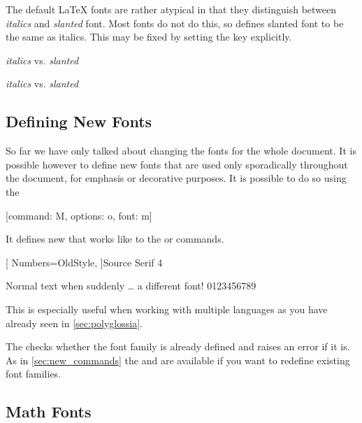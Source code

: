 The default \LaTeX{} fonts are rather atypical in that they distinguish between
\textit{italics} and \textsl{slanted} font. Most fonts do not do this, so
 defines slanted font to be the same as italics. This may be
fixed by setting the  key explicitly.
\begin{example}[vertical_mode, examplewidth=0.7\linewidth]
\setmainfont{Latin Modern Roman}
\textit{italics} vs. \textsl{slanted}

\setmainfont[
  SlantedFont=Latin Modern Roman Slanted,
]{Latin Modern Roman}
\textit{italics} vs. \textsl{slanted}
\end{example}

\subsection{Defining New Fonts}

So far we have only talked about changing the fonts for the whole document. It
is possible however to define new fonts that are used only sporadically
throughout the document, for emphasis or decorative purposes. It is possible to
do so using the
\begin{lscommand}
  [command: M, options: o, font: m]
\end{lscommand}
It defines new  that works like to the  or
 commands.
\begin{example}
\newfontfamily{\sourcefamily}[
  Numbers=OldStyle,
]{Source Serif 4}

Normal text when suddenly
\ldots{} \sourcefamily
a different font! 0123456789
\end{example}
This is especially useful when working with multiple languages as you have
already seen in \autoref{sec:polyglossia}.

The  checks whether the font family is already defined and
raises an error if it is. As in \autoref{sec:new_commands} the
 and  are available if you want to
redefine existing font families.

\subsection{Math Fonts}\label{sec:math_fonts}

